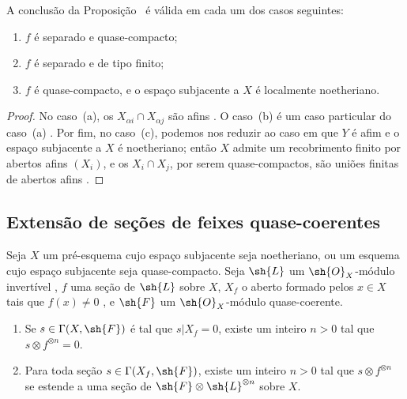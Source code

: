 \documentclass[oneside]{amsart}
\let\EGAOriginalLabel\label
\renewcommand{\label}[1]{\phantomsection\EGAOriginalLabel{#1}}
\begin{document}
\begin{corollary}[9.2.2]
\label{I.9.2.2}
A conclusão da Proposição~ é válida em cada um dos casos seguintes:
\begin{enumerate}
  \item[{\rm(a)}] $f$ é separado e quase-compacto;
  \item[{\rm(b)}] $f$ é separado e de tipo finito;
  \item[{\rm(c)}] $f$ é quase-compacto, e o espaço subjacente a $X$ é localmente noetheriano.
\end{enumerate}
\end{corollary}

\begin{proof}
No caso~(a), os $X_{\alpha i}\cap X_{\alpha j}$ são afins .
O caso~(b) é um caso particular do caso~(a) . Por fim, no caso~(c), podemos nos reduzir ao caso em que $Y$ é afim e o espaço subjacente a $X$ é noetheriano; então $X$ admite um recobrimento finito por abertos afins $(X_i)$, e os $X_i\cap X_j$, por serem quase-compactos, são uniões finitas de abertos afins .
\end{proof}

\subsection{Extensão de seções de feixes quase-coerentes}
\label{subsection:I.9.3}

\begin{theorem}[9.3.1]
\label{I.9.3.1}
Seja $X$ um pré-esquema cujo espaço subjacente seja noetheriano, ou um esquema cujo espaço
subjacente seja quase-compacto. Seja $\sh{L}$ um $\sh{O}_X$-módulo invertível , $f$ uma
seção de $\sh{L}$ sobre $X$, $X_f$ o aberto formado pelos $x\in X$ tais que $f(x)\neq0$
, e $\sh{F}$ um $\sh{O}_X$-módulo quase-coerente.
\begin{enumerate}
  \item[{\rm(i)}] Se $s\in\Gamma(X,\sh{F})$ é tal que $s|X_f=0$, existe um inteiro $n>0$ tal que $s\otimes f^{\otimes n}=0$.
  \item[{\rm(ii)}] Para toda seção $s\in\Gamma(X_f,\sh{F})$, existe um inteiro $n>0$ tal que $s\otimes f^{\otimes n}$ se estende a uma seção de $\sh{F}\otimes\sh{L}^{\otimes n}$ sobre $X$.
\end{enumerate}
\end{theorem}
\end{document}
